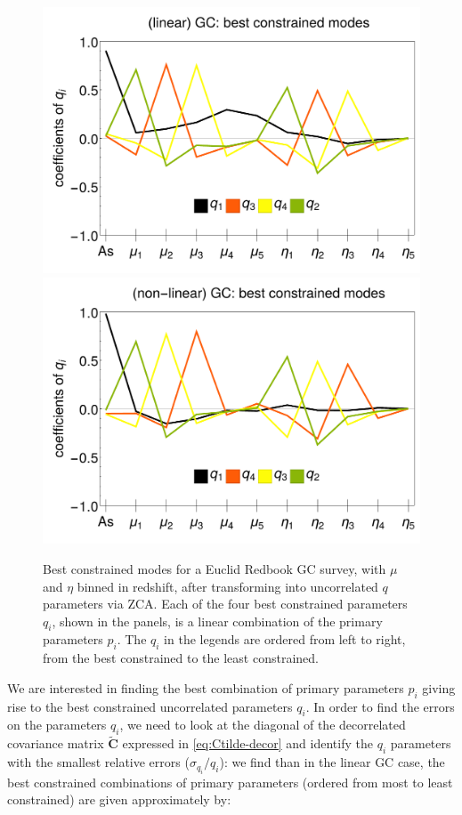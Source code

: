\begin{figure}[htbp]
	\centering{}\includegraphics[width=0.47\linewidth]{Chapters/linear-nonlinear-MG-forecasts/figures/Decorrelations-GC/linear_GC--_best_constrained_modes-Errors_on_q_ZCA_SquareNorm--_fiducialMGBin3_Euclid_GC_linearPK_}
	\includegraphics[width=0.47\linewidth]{Chapters/linear-nonlinear-MG-forecasts/figures/Decorrelations-GC/non-linear_GC--_best_constrained_modes-Errors_on_q_ZCA_SquareNorm--_fiducialMGBin3_Euclid_GC_nonlinearPk__Zhao_}
	\caption[Best constrained modes for Euclid GC applying ZCA.]{\label{fig:GCbestconst}
Best constrained modes for a Euclid Redbook GC survey, with $\mu$ and $\eta$ binned in redshift, 
after transforming into uncorrelated $q$ parameters via ZCA. 
Each of the four best constrained parameters $q_i$, shown in the panels, 
is a linear combination of the primary parameters $p_i$. The $q_i$ in the legends are ordered from left to right, from the best constrained to the least constrained.}
\end{figure}


We are interested in finding the best combination of primary parameters $p_i$ giving rise
to the best constrained uncorrelated parameters $q_i$. In order to find the errors 
on the parameters $q_i$, we need to look at the diagonal of the decorrelated covariance matrix $\mathbf{\tilde{C}}$ expressed in \cref{eq:Ctilde-decor} and 
identify the $q_i$ parameters with the smallest relative errors ($\sigma_{q_i}/q_i$): we find than in the linear GC case, the best 
constrained combinations of primary parameters (ordered from most to least constrained) are given approximately by:

